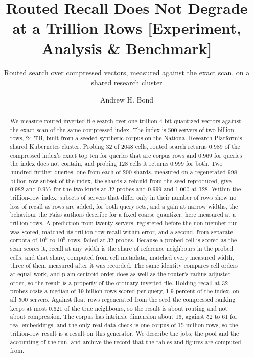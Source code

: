 \documentclass[sigconf, nonacm]{acmart}
\begin{document}
\title{Routed Recall Does Not Degrade at a Trillion Rows [Experiment, Analysis \& Benchmark]}
\subtitle{Routed search over compressed vectors, measured against the exact scan, on a shared research cluster}

\author{Andrew H. Bond}

\begin{abstract}
We measure routed inverted-file search over one trillion 4-bit quantized vectors against the exact
scan of the same compressed index. The index is 500 servers of two billion rows, 24 TB, built from
a seeded synthetic corpus on the National Research Platform's shared Kubernetes cluster. Probing 32
of 2048 cells, routed search returns 0.989 of the compressed index's exact top ten for queries that are corpus rows
and 0.969 for queries the index does not contain, and probing 128 cells it returns 0.999 for both.
Two hundred further queries, one from each of 200 shards, measured on a regenerated
998-billion-row subset of the index, the shards a rebuild from the seed reproduced, give 0.982 and
0.977 for the two kinds at 32 probes and 0.999 and 1.000 at 128. Within the trillion-row index, subsets of servers that differ only in their
number of rows show no loss of recall as rows are added, for both query sets, and a gain at narrow
widths, the behaviour the Faiss authors describe for a fixed coarse quantizer, here measured at a
trillion rows. A prediction from twenty servers, registered before the non-member run was scored,
matched its trillion-row recall within error, and a second, from separate corpora of $10^{8}$ to
$10^{9}$ rows, failed at 32 probes. Because a probed cell is scored as the scan scores it, recall at any width is the
share of reference neighbours in the probed cells, and that share, computed from cell metadata,
matched every measured width, three of them measured after it was recorded. The same identity
compares cell orders at equal work, and plain centroid order does as well as the router's
radius-adjusted order, so the result is a property of the ordinary inverted file. Holding recall at
32 probes costs a median of 19 billion rows scored per query, 1.9 percent of the index, on all 500
servers. Against float rows
regenerated from the seed the compressed ranking keeps at most 0.621 of the true neighbours, so the
result is about routing and not about compression. The corpus has intrinsic dimension about 16,
against 52 to 61 for real embeddings, and the only real-data check is one corpus of 15 million
rows, so the trillion-row result is a result on this generator. We describe the jobs, the pool and the
accounting of the run, and archive the record that the tables and figures are computed from.
\end{abstract}
\end{document}
